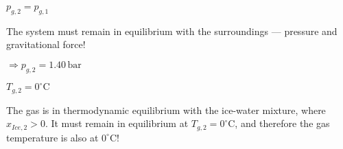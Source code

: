 \( p_{g,2} = p_{g,1} \)  

The system must remain in equilibrium with the surroundings — pressure and gravitational force!  

\( \Rightarrow p_{g,2} = 1.40 \, \text{bar} \)  

\( T_{g,2} = 0^\circ \text{C} \)  

The gas is in thermodynamic equilibrium with the ice-water mixture, where \( x_{Ice,2} > 0 \). It must remain in equilibrium at \( T_{g,2} = 0^\circ \text{C} \), and therefore the gas temperature is also at \( 0^\circ \text{C}! \)